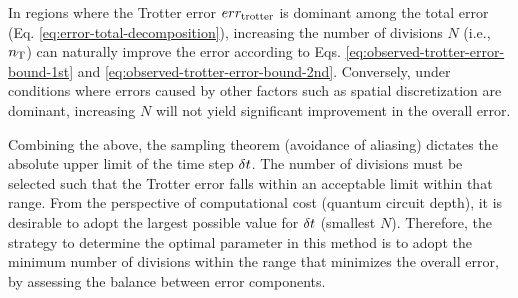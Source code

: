 \documentclass[jctc-draft.tex]{subfiles}
\begin{document}
In regions where the Trotter error $err_{\mathrm{trotter}}$ is dominant among the total
error (Eq. \eqref{eq:error-total-decomposition}), increasing the number of
divisions $N$ (i.e., $n_{\mathrm{T}}$) can naturally improve the error according to Eqs.
\eqref{eq:observed-trotter-error-bound-1st} and
\eqref{eq:observed-trotter-error-bound-2nd}. Conversely, under conditions where
errors caused by other factors such as spatial discretization are dominant,
increasing $N$ will not yield significant improvement in the overall error.

Combining the above, the sampling theorem (avoidance of aliasing) dictates the
absolute upper limit of the time step $\delta t$. The number of divisions must be
selected such that the Trotter error falls within an acceptable limit within that
range. From the perspective of computational cost (quantum circuit depth), it is
desirable to adopt the largest possible value for $\delta t$ (smallest $N$).
Therefore, the strategy to determine the optimal parameter in this method is to
adopt the minimum number of divisions within the range that minimizes the
overall error, by assessing the balance between error components.
\end{document}
